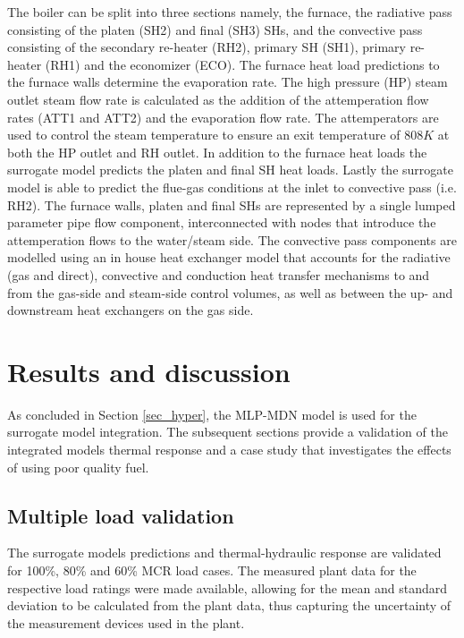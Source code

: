 \documentclass[a4paper,fleqn]{cas-sc}
\begin{document}
The boiler can be split into three sections namely, the furnace, the radiative pass consisting of the platen (SH2) and final (SH3) SHs, and the convective pass consisting of the secondary re-heater (RH2), primary SH (SH1), primary re-heater (RH1) and the economizer (ECO). The furnace heat load predictions to the furnace walls determine the evaporation rate. The high pressure (HP) steam outlet steam flow rate is calculated as the addition of the attemperation flow rates (ATT1 and ATT2) and the evaporation flow rate. The attemperators are used to control the steam temperature to ensure an exit temperature of $808K$ at both the HP outlet and RH outlet. In addition to the furnace heat loads the surrogate model predicts the platen and final SH heat loads. Lastly the surrogate model is able to predict the flue-gas conditions at the inlet to convective pass (i.e. RH2). The furnace walls, platen and final SHs are represented by a single lumped parameter pipe flow component, interconnected with nodes that introduce the attemperation flows to the water/steam side. The convective pass components are modelled using an in house heat exchanger model that accounts for the radiative (gas and direct), convective and conduction heat transfer mechanisms to and from the gas-side and steam-side control volumes, as well as between the up- and downstream heat exchangers on the gas side.

\section{Results and discussion}\label{sec_results_diss}
As concluded in Section \ref{sec_hyper}, the MLP-MDN model is used for the surrogate model integration. The subsequent sections provide a validation of the integrated models thermal response and a case study that investigates the effects of using poor quality fuel. 

\subsection{Multiple load validation}\label{sec_result_1}
The surrogate models predictions and thermal-hydraulic response are validated for 100\%, 80\% and 60\% MCR load cases. The measured plant data for the respective load ratings were made available, allowing for the mean and standard deviation to be calculated from the plant data, thus capturing the uncertainty of the measurement devices used in the plant.\\ 
\end{document}
